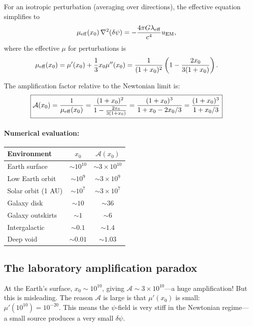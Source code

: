 \documentclass[12pt,aps,prd,twocolumn,superscriptaddress,nofootinbib]{revtex4-2}
\newcommand{\lam}{\lambda}
\begin{document}
For an isotropic perturbation (averaging over directions), the
effective equation simplifies to
\begin{equation}\label{eq:isotropic-perturbation}
\mu_{\rm eff}(x_0)\,\nabla^2(\delta\psi)
= -\frac{4\pi G\lam_{\rm eff}}{c^4}u_{\rm EM},
\end{equation}
where the effective $\mu$ for perturbations is
\begin{equation}\label{eq:mu-eff-pert}
\mu_{\rm eff}(x_0) = \mu'(x_0) + \frac{1}{3}x_0\mu''(x_0)
= \frac{1}{(1+x_0)^2}\left(1 - \frac{2x_0}{3(1+x_0)}\right).
\end{equation}

The amplification factor relative to the Newtonian limit is:
\begin{equation}\label{eq:amplification}
\boxed{
\mathcal{A}(x_0) = \frac{1}{\mu_{\rm eff}(x_0)}
= \frac{(1+x_0)^2}{1 - \frac{2x_0}{3(1+x_0)}}
= \frac{(1+x_0)^3}{1+x_0 - 2x_0/3}
= \frac{(1+x_0)^3}{1+x_0/3}
}
\end{equation}

\paragraph{Numerical evaluation:}
\begin{center}
\begin{tabular}{lcc}
\toprule
Environment & $x_0$ & $\mathcal{A}(x_0)$ \\
\midrule
Earth surface & $\sim 10^{10}$ & $\sim 3\times10^{10}$ \\
Low Earth orbit & $\sim 10^9$ & $\sim 3\times10^9$ \\
Solar orbit (1 AU) & $\sim 10^7$ & $\sim 3\times10^7$ \\
Galaxy disk & $\sim 10$ & $\sim 36$ \\
Galaxy outskirts & $\sim 1$ & $\sim 6$ \\
Intergalactic & $\sim 0.1$ & $\sim 1.4$ \\
Deep void & $\sim 0.01$ & $\sim 1.03$ \\
\bottomrule
\end{tabular}
\end{center}

\subsection{The laboratory amplification paradox}
\label{sec:lab-paradox}

At the Earth's surface, $x_0 \sim 10^{10}$, giving
$\mathcal{A} \sim 3\times 10^{10}$---a huge amplification!
But this is misleading. The reason $\mathcal{A}$ is large is
that $\mu'(x_0)$ is small: $\mu'(10^{10}) = 10^{-20}$. This
means the $\psi$-field is very stiff in the Newtonian regime---a
small source produces a very small $\delta\psi$.
\end{document}
